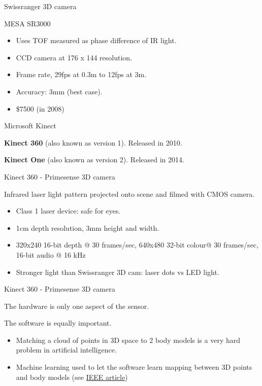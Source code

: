 \documentclass[compress]{beamer}
\begin{document}
\begin{frame}{Swissranger 3D camera}

MESA SR3000

\begin{itemize}

\item
  Uses TOF measured as phase difference of IR light.
\item
  CCD camera at 176 x 144 resolution.
\item
  Frame rate, 29fps at 0.3m to 12fps at 3m.
\item
  Accuracy: 3mm (best case).
\item
  \$7500 (in 2008)
\end{itemize}

\end{frame}

\begin{frame}{Microsoft Kinect}

\textbf{Kinect 360} (also known as version 1). Released in 2010.

\textbf{Kinect One} (also known as version 2). Released in 2014.

\end{frame}

\begin{frame}{Kinect 360 - Primesense 3D camera}

Infrared laser light pattern projected onto scene and filmed with CMOS
camera.

\begin{itemize}

\item
  Class 1 laser device: safe for eyes.
\item
  1cm depth resolution, 3mm height and width.
\item
  320x240 16-bit depth @ 30 frames/sec, 640x480 32-bit colour@ 30
  frames/sec, 16-bit audio @ 16 kHz
\item
  Stronger light than Swissranger 3D cam: laser dots vs LED light.
\end{itemize}

\end{frame}

\begin{frame}{Kinect 360 - Primesense 3D camera}

The hardware is only one aspect of the sensor.

The software is equally important.

\begin{itemize}

\item
  Matching a cloud of points in 3D space to 2 body models is a very hard
  problem in artificial intelligence.
\item
  Machine learning used to let the software learn mapping between 3D
  points and body models (see
  \href{http://www.theinstitute.ieee.org/portal/site/tionline/menuitem.130a3558587d56e8fb2275875bac26c8/index.jsp?\&pName=institute_level1_article\&TheCat=2201\&article=tionline/legacy/inst2011/jan11/featuretech.xml\&}{IEEE
  article})
\end{itemize}

\end{frame}
\end{document}
